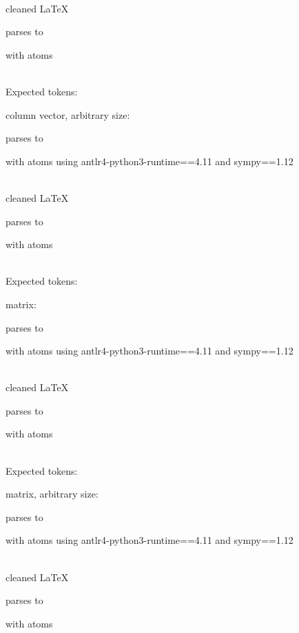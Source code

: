 \documentclass{article}
\begin{document}
\ \\
cleaned \LaTeX

parses to

with atoms


\ \\
Expected tokens:


\hrulefill


column vector, arbitrary size:

parses to

with atoms
using antlr4-python3-runtime==4.11 and sympy==1.12

\ \\
cleaned \LaTeX

parses to

with atoms


\ \\
Expected tokens:



\hrulefill



matrix:

parses to

with atoms
using antlr4-python3-runtime==4.11 and sympy==1.12

\ \\
cleaned \LaTeX

parses to

with atoms


\ \\
Expected tokens:


\hrulefill


matrix, arbitrary size:

parses to

with atoms
using antlr4-python3-runtime==4.11 and sympy==1.12

\ \\
cleaned \LaTeX

parses to

with atoms

\end{document}
